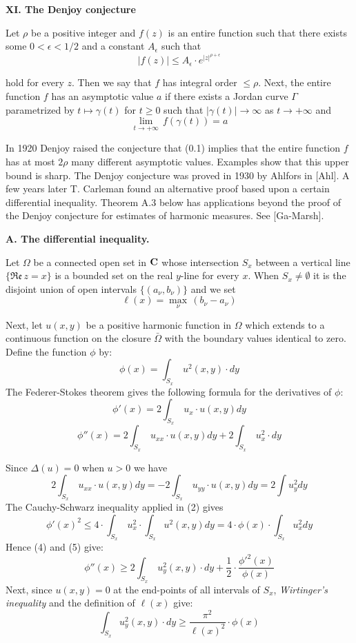 \documentclass{amsart}
\def\uuu{_}
\begin{document}
\centerline{\bf\large{XI. The Denjoy conjecture}}

\bigskip

Let $\rho$ be a positive integer and 
$f(z)$  is an entire function such that there exists some
$0<\epsilon<1/2 $  and a constant $A_\epsilon$ such that
\[
|f(z)|\leq A_\epsilon\cdot e^{|z|^{\rho+\epsilon}}\tag{0.1}
\]


\noindent
hold for every $z$. Then we say that 
$f$ has integral order $\leq\rho$.
Next, the entire function $f$ has an asymptotic value $a$
if there exists a Jordan curve
$\Gamma$ parametrized
by
$t\mapsto\gamma(t)$ for $t\geq 0$ such that
$|\gamma(t)|\to \infty$ as $t\to+\infty$ and
\[
\lim_{t\to+\infty}\, f(\gamma(t))=a\tag{0.2}
\]


\noindent
In 1920 Denjoy raised the conjecture that
(0.1) implies that the entire function $f$ has at most
$2\rho$ many different asymptotic values. Examples show that
this upper bound is sharp.
The Denjoy conjecture was proved in 1930 by  Ahlfors in [Ahl].
A few years later T. Carleman found an alternative  proof based
upon a certain differential inequality.
Theorem A.3 below 
has  applications beyond the proof of
the Denjoy conjecture
for estimates of
harmonic measures. See [Ga-Marsh].

\bigskip

\centerline{\bf A. The  differential inequality.}
\bigskip


\noindent
Let $\Omega$ be a connected open set in ${\bf{C}}$ whose
intersection $S\uuu x$ between
a  vertical line  $\{\mathfrak{Re}\, z=x\}$
is a bounded set
on the real $y$-line for every $x$.
When $S_x\neq\emptyset $ it is the disjoint union
of open
intervals $\{(a_\nu,b_\nu)\}$ and we set
\[ 
\ell(x)=\max\uuu \nu \,(b_\nu-a_\nu)\tag{*}
\]

\medskip


\noindent
Next, let
$u(x,y)$ be a positive harmonic   function
in $\Omega$ which 
extends to a continuous function on
the closure $\bar\Omega$  with the boundary values identical to zero.
Define the function $\phi$ by:
\[ 
\phi(x)=\int_{S_x}\,u^2(x,y)\cdot dy\tag{1}
\]
The Federer-Stokes theorem gives
the following  formula for the derivatives of $\phi$:
\[ 
\phi'(x)=2\int_{S_x}\,u_x\cdot u(x,y) dy\tag{2}
\]
\[
\phi''(x)=2\int_{S_x}\,u_{xx}\cdot u(x,y) dy+
2\int_{S_x}\,u^2_x\cdot dy\tag{3}
\]


\noindent
Since $\Delta(u)=0$ when $u>0$ we have
\[
2\int_{S_x}\,u_{xx}\cdot u(x,y) dy=-
2\int_{S_x}\,u_{yy}\cdot u(x,y) dy=
2\int u_y^2 dy\tag{4}
\]
The Cauchy-Schwarz inequality applied in (2) gives
\[
\phi'(x)^2\leq 4\cdot \int_{S_x}\,u^2_x\cdot\int_{S_x} u^2(x,y) dy
=4 \cdot \phi(x)\cdot \int_{S_x}u_x^2dy\tag{5}
\]
Hence (4) and (5) give:
\[ 
\phi''(x)\geq 2\int\uuu{S\uuu x} \,u^2_y(x,y)\cdot dy+\frac{1}{2}\cdot \frac{\phi'^2(x)}{\phi(x)}\tag{6}
\]
Next, since $u(x,y)=0$ at the end-points of all intervals of $S_x$,
\emph{Wirtinger's 
inequality}
and the definition of $\ell(x)$ give:
\[
\int\uuu{S\uuu x} u^2_y(x,y)\cdot dy\geq \frac{\pi^2}{\ell(x)^2}\cdot\phi(x)\tag{7}
\]
\end{document}
